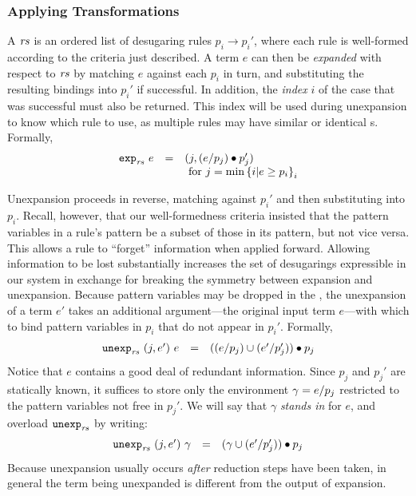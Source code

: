 \subsubsection{Applying Transformations}

A \emph{} $\mathit{rs}$ is an ordered list of desugaring
rules $p_i \to p_i'$, where each rule is well-formed according to the
criteria just described.
A term $e$ can then be \emph{expanded} with respect to
$\mathit{rs}$ by matching $e$ against each $p_i$ in turn, and substituting
the resulting bindings into $p_i'$ if successful. In addition, the
\emph{index} $i$ of the case that was successful
must also be returned. This index will be used during unexpansion
to know which rule to use, as multiple rules may have similar or identical
s. Formally,
\[\begin{array}{lllll}
   \texttt{exp}_{\mathit{rs}}\ {e} &=&
    (j, (e / p_j) \bullet p_j') \\
    &&\text{ for }
      j = \min \left\{ i | e \geq p_i \right\}_i \\
\end{array}\]

Unexpansion proceeds in reverse, matching against $p_i'$ and then
substituting into $p_i$. Recall, however, that our well-formedness
criteria insisted that the pattern variables in a rule's  pattern be a
subset of those in its  pattern, but not vice versa. This allows a
rule to ``forget'' information when applied forward. Allowing information
to be lost substantially increases the set of desugarings expressible in
our system in exchange for breaking the symmetry between expansion and
unexpansion. Because pattern variables may be dropped in the , the
unexpansion of a term $e'$ takes an additional argument---the original
input term $e$---with which to bind pattern variables in $p_i$ that do not
appear in $p_i'$. Formally,
\[\begin{array}{lllll}
  \texttt{unexp}_{\mathit{rs}}\ {(j, e')}\ {e} &=&
    ((e / p_j) \cup (e' / p_j')) \bullet p_j
\end{array}\]
Notice that $e$ contains a good deal of redundant
information. Since $p_j$ and $p_j'$ are statically known, it
suffices to store only the environment $\gamma = e / p_j$
restricted to the pattern variables not free in $p_j'$. We will say that $\gamma$
\emph{stands in} for $e$, and overload $\texttt{unexp}_{\mathit{rs}}$ by writing:
\[\begin{array}{lllll}
  \texttt{unexp}_{\mathit{rs}}\ {(j, e')}\ {\gamma} &=&
    (\gamma \cup (e' / p_j')) \bullet p_j
\end{array}\]
Because unexpansion usually occurs \emph{after} reduction steps have
been taken, in general the term being unexpanded is different
from the output of expansion.


